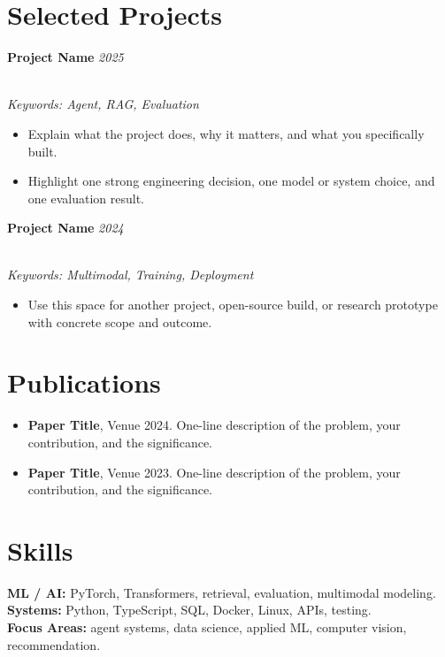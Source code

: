 \documentclass[a4paper,11pt]{extarticle}
\newcommand{\projectentry}[2]{%
  \textbf{#1} \hfill \textit{#2}
}
\newcommand{\projectkeywords}[1]{%
  \\[-1pt]{\footnotesize\textit{Keywords: #1}}
}
\begin{document}
\section{Selected Projects}
\projectentry{Project Name}{2025}
\projectkeywords{Agent, RAG, Evaluation}
\vspace{-0.7em}
{\small
\begin{itemize}
  \item Explain what the project does, why it matters, and what you specifically built.
  \item Highlight one strong engineering decision, one model or system choice, and one evaluation result.
\end{itemize}
}

\projectentry{Project Name}{2024}
\projectkeywords{Multimodal, Training, Deployment}
\vspace{-0.7em}
{\small
\begin{itemize}
  \item Use this space for another project, open-source build, or research prototype with concrete scope and outcome.
\end{itemize}
}

\section{Publications}
{\small
\begin{itemize}
  \item \textbf{Paper Title}, Venue 2024. One-line description of the problem, your contribution, and the significance.
  \item \textbf{Paper Title}, Venue 2023. One-line description of the problem, your contribution, and the significance.
\end{itemize}
}

\section{Skills}
{\small
\textbf{ML / AI:} PyTorch, Transformers, retrieval, evaluation, multimodal modeling.\\
\textbf{Systems:} Python, TypeScript, SQL, Docker, Linux, APIs, testing.\\
\textbf{Focus Areas:} agent systems, data science, applied ML, computer vision, recommendation.
}
\end{document}

